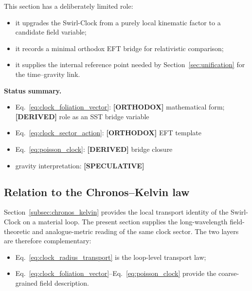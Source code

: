 \documentclass[11pt]{article}
\theoremstyle{definition}
\theoremstyle{plain}
\theoremstyle{remark}
\begin{document}
        This section has a deliberately limited role:
        \begin{itemize}
            \item it upgrades the Swirl-Clock from a purely local kinematic factor to a candidate field variable;
            \item it records a minimal orthodox EFT bridge for relativistic comparison;
            \item it supplies the internal reference point needed by Section~\ref{sec:unification} for the time--gravity link.
        \end{itemize}

        \textbf{Status summary.}
        \begin{itemize}
            \item Eq.~\eqref{eq:clock_foliation_vector}: \textbf{[ORTHODOX]} mathematical form; \textbf{[DERIVED]} role as an SST bridge variable
            \item Eq.~\eqref{eq:clock_sector_action}: \textbf{[ORTHODOX]} EFT template
            \item Eq.~\eqref{eq:poisson_clock}: \textbf{[DERIVED]} bridge closure
            \item gravity interpretation: \textbf{[SPECULATIVE]}
        \end{itemize}

    \subsection{Relation to the Chronos--Kelvin law}

        Section~\ref{subsec:chronos_kelvin} provides the local transport identity of the Swirl-Clock on a material loop. The present section supplies the long-wavelength field-theoretic and analogue-metric reading of the same clock sector. The two layers are therefore complementary:

        \begin{itemize}
            \item Eq.~\eqref{eq:clock_radius_transport} is the loop-level transport law;
            \item Eq.~\eqref{eq:clock_foliation_vector}--Eq.~\eqref{eq:poisson_clock} provide the coarse-grained field description.
        \end{itemize}

        
\end{document}
